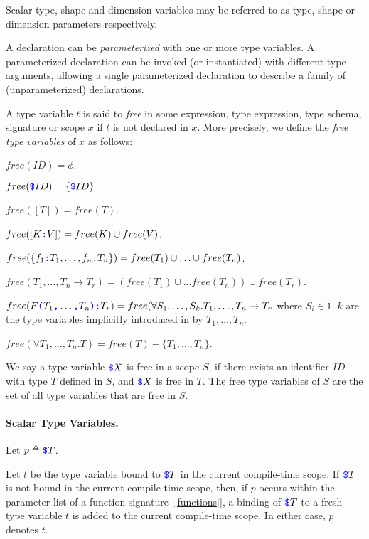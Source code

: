 \documentclass{article}
\begin{document}
Scalar type, shape and dimension variables may be referred to as type, shape or dimension parameters respectively.

 A declaration can be {\em parameterized} with one or more type variables. A parameterized declaration can be invoked (or instantiated) with different type arguments, allowing a single parameterized declaration to describe a family of (unparameterized) declarations. 
 
 A type variable $t$ is said to {\em free} in some expression, type expression, type schema, signature or scope $x$ if $t$ is not declared in $x$.  More precisely, we define the {\em free type variables} of $x$ as follows:
 
 $free(ID) = \phi$.
 
 $free(\texttt{\color{blue} \$}{}ID) = \{\texttt{\color{blue} \$}{}ID\}$ 
 
 $free([T]) = free(T)$.
 
 $free([K \texttt{\color{blue} :}{} V]) = free(K) \cup free(V)$.
 
 $free(\{f_1\texttt{\color{blue} :}{} T_1, \ldots, f_n\texttt{\color{blue} :}{} T_n\}) =  free(T_1) \cup \ldots \cup free(T_n)$.
 
 $free(T_1, \ldots, T_n \to T_r) = (free(T_1) \cup \ldots free(T_n)) \cup free(T_r)$. 
 
 $free(F\texttt{\color{blue} (}{} T_1\texttt{\color{blue} ,}{} \ldots\texttt{\color{blue} ,}{} T_n\texttt{\color{blue} )}\texttt{\color{blue} :}{}T_r) = free(\forall S_1, \ldots, S_k. T_1, \ldots, T_n \to T_r$ where $S_i \in 1..k$ are the type variables implicitly introduced in by $T_1, \ldots, T_n$.
 
 $free(\forall T_1, \ldots, T_n.T) = free(T) - \{T_1, \ldots, T_n\}$.
 
 
 We say a type variable $\texttt{\color{blue} \$}{}X$ is free in a scope $S$, if there exists an identifier $ID$ with type $T$ defined in $S$, and $\texttt{\color{blue} \$}{}X$ is free in $T$. The free type variables of $S$ are the set of all type variables that are free in $S$.

\paragraph{Scalar Type Variables.}
 
 Let $p \triangleq \texttt{\color{blue} \$}{}T$.
 
 Let $t$ be the type variable bound to $\texttt{\color{blue} \$}{}T$ in the current compile-time scope. If $\texttt{\color{blue} \$}{}T$ is not bound in the current compile-time scope, then, if $p$ occurs within  the parameter list of a function signature [\ref{functions}],  a binding of $\texttt{\color{blue} \$}{}T$ to a fresh type variable $t$ is added to the current compile-time scope. In either case, $p$ denotes  $t$. 
 
\end{document}
